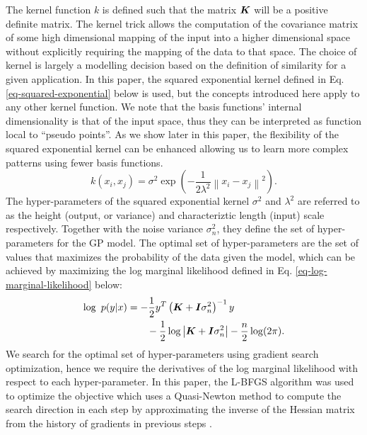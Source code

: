\documentclass[useAMS,usenatbib,fleqn]{mn2e}
\begin{document}
The kernel function $k$ is defined such that the matrix $\bmath{K}$ will be a positive definite matrix. The kernel trick allows the computation of the covariance matrix of some high dimensional mapping of the input into a higher dimensional space without explicitly requiring the mapping of the data to that space. The choice of kernel is largely a modelling decision based on the definition of similarity for a given application. In this paper, the squared exponential kernel defined in  Eq. \eqref{eq-squared-exponential} below is used, but the concepts introduced here apply to any other kernel function. We note that the basis functions' internal dimensionality is that of the input space, thus they can be interpreted as function local to ``pseudo points''. As we show later in this paper, the flexibility of the squared exponential kernel can be enhanced allowing us to learn more complex patterns using fewer basis functions.
\begin{equation}
\label{eq-squared-exponential}
k(x_{i},x_{j}) = \sigma^{2} \exp \left ( -\frac{1} {2\lambda^{2}} \left \|x_{i}-x_{j}\right\|^{2}\right ).
\end{equation}
The hyper-parameters of the squared exponential kernel $\sigma^{2}$ and $\lambda^{2}$ are referred to as the height (output, or variance) and characteriztic length (input) scale respectively. Together with the noise variance $\sigma_{n}^{2}$, they define the set of hyper-parameters for the GP model. The optimal set of hyper-parameters are the set of values that maximizes the probability of the data given the model, which can be achieved by maximizing the log marginal likelihood defined in Eq. \eqref{eq-log-marginal-likelihood} below:
\begin{align}
\label{eq-log-marginal-likelihood}
\log\text{ }p(y|x) &= -\frac{1}{2}y^{T}\left(\bmath{K}+\bmath{I}\sigma_{n}^{2} \right)^{-1}y \nonumber \\
&\qquad -\frac{1}{2} \log\left | \bmath{K}+\bmath{I}\sigma_{n}^{2}\right|-\frac{n}{2}\log(2\pi).
\end{align}
We search for the optimal set of hyper-parameters using gradient search optimization, hence we require the derivatives of the log marginal likelihood with respect to each hyper-parameter. In this paper, the L-BFGS algorithm was used to optimize the objective which uses a Quasi-Newton method to compute the search direction in each step by approximating the inverse of the Hessian matrix from the history of gradients in previous steps \citep{jorge1980,schmidt2005}.
\end{document}
